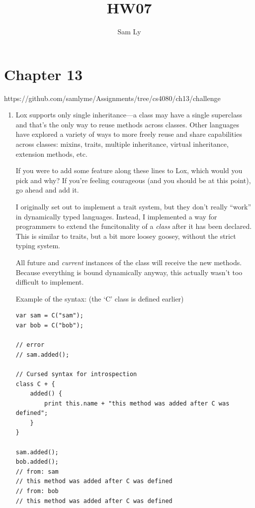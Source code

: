 \documentclass{article}
\title{HW07}
\author{Sam Ly}
\begin{document}
\maketitle

\section*{Chapter 13}

https://github.com/samlyme/Assignments/tree/cs4080/ch13/challenge

\begin{enumerate}
    \item {
        Lox supports only single inheritance—a class may have a single superclass and that’s the only way to reuse methods across classes. Other languages have explored a variety of ways to more freely reuse and share capabilities across classes: mixins, traits, multiple inheritance, virtual inheritance, extension methods, etc.

If you were to add some feature along these lines to Lox, which would you pick and why? If you’re feeling courageous (and you should be at this point), go ahead and add it.

        I originally set out to implement a trait system, but they don't really 
        ``work'' in dynamically typed languages. Instead, I implemented a way 
        for programmers to extend the funcitonality of a \emph{class} after 
        it has been declared. This is similar to traits, but a bit more loosey
        goosey, without the strict typing system.
        
        All future and \emph{current} instances of the class 
        will receive the new methods. Because everything is bound dynamically 
        anyway, this actually wasn't too difficult to implement.

        Example of the syntax: (the `C' class is defined earlier)
        \begin{verbatim}
var sam = C("sam");
var bob = C("bob");

// error
// sam.added();

// Cursed syntax for introspection
class C + {
    added() {
        print this.name + "this method was added after C was defined";
    }
}

sam.added();
bob.added();
// from: sam
// this method was added after C was defined
// from: bob
// this method was added after C was defined
        \end{verbatim}

}
\end{enumerate}
\end{document}
